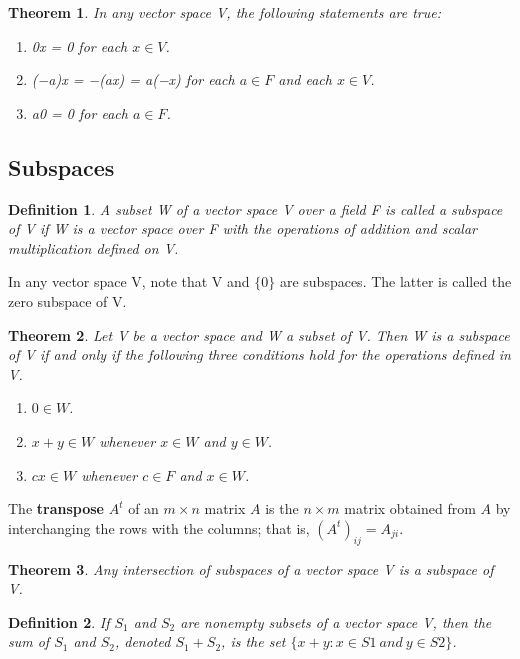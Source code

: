 \documentclass{article}
\newcommand{\bd}[1]{\textbf{#1}}
\theoremstyle{plain}
\newtheorem{theorem}{Theorem}[section]
\newtheorem*{definition1}{Definition}
\theoremstyle{plain} %
\begin{document}
\begin{theorem}
In any vector space V, the following statements are true:
\begin{enumerate}[label=(\alph*)]
\item 0x = 0 for each $x \in V$.
\item (−a)x = −(ax) = a(−x) for each $a \in F$ and each $x \in V$.
\item a0 = 0 for each $a \in  F$.
\end{enumerate}
\end{theorem}

\subsection{Subspaces}

\begin{definition1}
A subset W of a vector space V over a field F is called a
subspace of V if W is a vector space over F with the operations of addition
and scalar multiplication defined on V.
\end{definition1}

In any vector space V, note that V and $\{0\}$ are subspaces. The latter is called the zero subspace of V.

\begin{theorem}
Let V be a vector space and W a subset of V. Then W
is a subspace of V if and only if the following three conditions hold for the
operations defined in V.
\begin{enumerate}[label=(\alph*)]
\item $0 \in W$.
\item $x + y \in W$ whenever $x \in W$ and $y \in W$.
\item $cx \in W$ whenever $c \in F$ and $x \in W$.
\end{enumerate}
\end{theorem}

The \bd{transpose} $A^t$ of an $m \times n$ matrix $A$ is the $n \times m$ matrix obtained from $A$ by interchanging the rows with the columns; that is, $(A^t)_{ij} = A_{ji}$.

\begin{theorem}
Any intersection of subspaces of a vector space V is a subspace of V.
\end{theorem}

\begin{definition1}
If $S_1$ and $S_2$ are nonempty subsets of a vector space V, then the sum of $S_1$ and $S_2$, denoted $S_1 +S_2$, is the set $\{x+y : x \in S1~and~y \in S2\}$.
\end{definition1}
\end{document}
